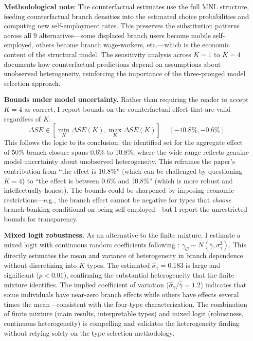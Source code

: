 \documentclass[12pt]{article}
\begin{document}
\textbf{Methodological note}: The counterfactual estimates use the full MNL structure, feeding counterfactual branch densities into the estimated choice probabilities and computing new self-employment rates. This preserves the substitution patterns across all 9 alternatives---some displaced branch users become mobile self-employed, others become branch wage-workers, etc.---which is the economic content of the structural model. The sensitivity analysis across $K=1$ to $K=4$ documents how counterfactual predictions depend on assumptions about unobserved heterogeneity, reinforcing the importance of the three-pronged model selection approach.

\textbf{Bounds under model uncertainty.} Rather than requiring the reader to accept $K=4$ as correct, I report bounds on the counterfactual effect that are valid regardless of $K$:
\begin{equation}
\Delta SE \in \left[\min_K \Delta SE(K), \max_K \Delta SE(K)\right] = [-10.8\%, -0.6\%]
\end{equation}
This follows the \citet{bonhomme2022} logic to its conclusion: the identified set for the aggregate effect of 50\% branch closure spans 0.6\% to 10.8\%, where the wide range reflects genuine model uncertainty about unobserved heterogeneity. This reframes the paper's contribution from ``the effect is 10.8\%'' (which can be challenged by questioning $K=4$) to ``the effect is between 0.6\% and 10.8\%'' (which is more robust and intellectually honest). The bounds could be sharpened by imposing economic restrictions---e.g., the branch effect cannot be negative for types that \textit{choose} branch banking conditional on being self-employed---but I report the unrestricted bounds for transparency.

\textbf{Mixed logit robustness.} As an alternative to the finite mixture, I estimate a mixed logit with continuous random coefficients following \citet{train2009}: $\gamma_C \sim N(\bar{\gamma}, \sigma^2_\gamma)$. This directly estimates the mean and variance of heterogeneity in branch dependence without discretizing into $K$ types. The estimated $\hat{\sigma}_\gamma = 0.183$ is large and significant ($p < 0.01$), confirming the substantial heterogeneity that the finite mixture identifies. The implied coefficient of variation ($\hat{\sigma}_\gamma / \hat{\bar{\gamma}} = 1.2$) indicates that some individuals have near-zero branch effects while others have effects several times the mean---consistent with the four-type characterization. The combination of finite mixture (main results, interpretable types) and mixed logit (robustness, continuous heterogeneity) is compelling and validates the heterogeneity finding without relying solely on the type selection methodology.
\end{document}
